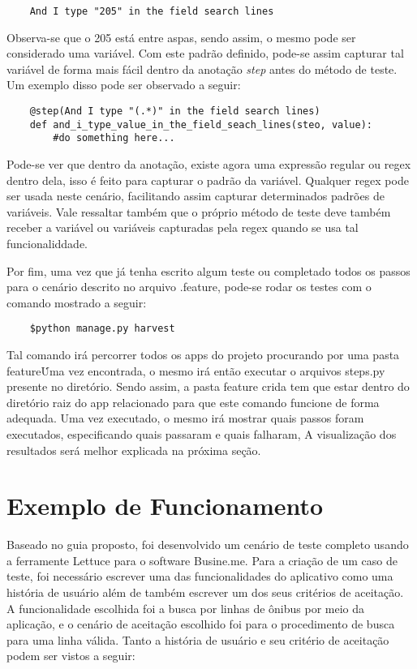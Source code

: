     \begin{verbatim}
    And I type "205" in the field search lines
    \end{verbatim}

    Observa-se que o 205 está entre aspas, sendo assim, o mesmo pode ser
    considerado uma variável. Com este padrão definido, pode-se assim capturar
    tal variável de forma mais fácil dentro da anotação \textit{step} antes do
    método de teste. Um exemplo disso pode ser observado a seguir:

    \begin{verbatim}
    @step(And I type "(.*)" in the field search lines)
    def and_i_type_value_in_the_field_seach_lines(steo, value):
        #do something here...
    \end{verbatim}

    Pode-se ver que dentro da anotação, existe agora uma expressão regular ou
    regex dentro dela, isso é feito para capturar o padrão da variável. Qualquer
    regex pode ser usada neste cenário, facilitando assim capturar determinados
    padrões de variáveis. Vale ressaltar também que o próprio método de teste
    deve também receber a variável ou variáveis capturadas pela regex quando se
    usa tal funcionaliddade.

    Por fim, uma vez que já tenha escrito algum teste ou completado todos os
    passos para o cenário descrito no arquivo .feature, pode-se rodar os testes
    com o comando mostrado a seguir:

    \begin{verbatim}
    $python manage.py harvest
    \end{verbatim}

    Tal comando irá percorrer todos os apps do projeto procurando por uma pasta
    feature\. Uma vez encontrada, o mesmo irá então executar o arquivos steps.py
    presente no diretório. Sendo assim, a pasta feature crida tem que estar
    dentro do diretório raiz do app relacionado para que este comando funcione
    de forma adequada. Uma vez executado, o mesmo irá mostrar quais passos foram
    executados, especificando quais passaram e quais falharam, A visualização
    dos resultados será melhor explicada na próxima seção.

\section{Exemplo de Funcionamento}

    Baseado no guia proposto, foi desenvolvido um cenário de teste completo
    usando a ferramente Lettuce para o software Busine.me. Para a criação de um
    caso de teste, foi necessário escrever uma das funcionalidades do aplicativo
    como uma história de usuário além de também escrever um dos seus critérios
    de aceitação.  A funcionalidade escolhida foi a busca por linhas de ônibus por
    meio da aplicação, e o cenário de aceitação escolhido foi para o
    procedimento de busca para uma linha válida. Tanto a história de usuário e
    seu critério de aceitação podem ser vistos a seguir:

